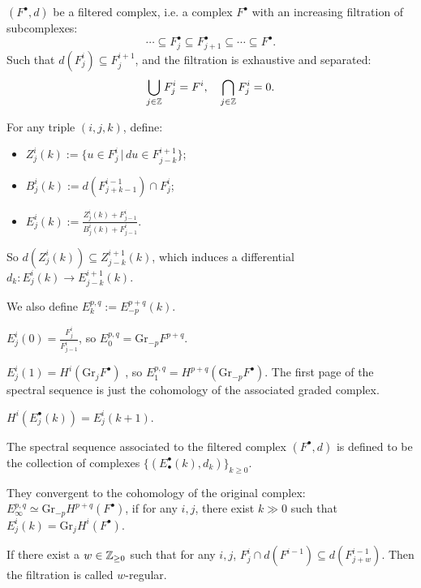 \documentclass[12pt]{amsart}
\numberwithin{equation}{section}
\newcommand{\set}[2]{\{#1\,|\,#2\}}
\begin{document}
$(F^{\bullet},d)$ be a filtered complex, i.e. a complex $F^{\bullet}$ with an increasing filtration of subcomplexes:
\[\cdots \subseteq F_j^{\bullet} \subseteq F^{\bullet}_{j+1} \subseteq \cdots \subseteq F^{\bullet}.\]
Such that $d(F^i_j) \subseteq F^{i+1}_j$, and the filtration is exhaustive and separated:
\[\bigcup_{j \in {\mathbb {Z}}} F^i_j = F^i, \quad \bigcap_{j \in {\mathbb {Z}}} F^i_j = 0.\]



For any triple $(i,j,k)$, define:
\begin{itemize}
  \item $Z^i_j(k) := \set{u \in F^i_j}{du \in F^{i+1}_{j-k}}$;
  \item $B^i_j(k) := d(F^{i-1}_{j+k-1}) \cap F^i_j$;
  \item $E^i_j(k) := \frac{Z^i_j(k) + F^i_{j-1}}{B^i_j(k) + F^i_{j-1}}$.
\end{itemize}
So $d(Z^i_j(k)) \subseteq Z^{i+1}_{j-k}(k)$, which induces a differential $d_k : E^i_j(k) \to E^{i+1}_{j-k}(k)$. 

We also define $E^{p,q}_k := E_{-p}^{p+q}(k).$

\begin{examp}
  
  $E^i_j(0) = \frac{F^i_j}{F^i_{j-1}}$, so $E^{p,q}_0 = \mathrm{Gr}_{-p} F^{p+q}$. 
  
  $E^i_j(1) = H^i(\mathrm{Gr}_j F^{\bullet})$ , so $E^{p,q}_1 = H^{p+q}(\mathrm{Gr}_{-p} F^{\bullet})$.
  The first page of the spectral sequence is just the cohomology of the associated graded complex.
\end{examp}


\begin{lem}
  $H^i(E^{\bullet}_{j}(k)) = E^{i}_{j}(k+1)$.
\end{lem}

\begin{defn}
  The spectral sequence associated to the filtered complex $(F^{\bullet},d)$ is defined to be the collection of complexes $\{(E^{\bullet}_{\bullet}(k),d_k)\}_{k \geq 0}$. 
  
  They convergent to the cohomology of the original complex:
  $E^{p,q}_{\infty} \simeq \mathrm{Gr}_{-p} H^{p+q}(F^{\bullet})$, if for any $i,j$, there exist $k \gg  0$ such that $E^i_j(k) = \mathrm{Gr}_j H^i(F^{\bullet})$.

\end{defn}

\begin{defn}
  If there exist a $w \in {\mathbb {Z}}_{\geq 0}$ such that for any $i,j$, $F^i_j \cap d(F^{i-1}) \subseteq d(F^{i-1}_{j+w})$.
  Then the filtration is called $w$-regular.
\end{defn}
\end{document}
